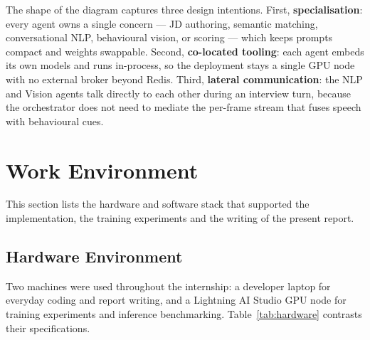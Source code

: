 The shape of the diagram captures three design intentions. First,
\textbf{specialisation}: every agent owns a single concern --- JD
authoring, semantic matching, conversational \acs{NLP}, behavioural
vision, or scoring --- which keeps prompts compact and weights
swappable. Second, \textbf{co-located tooling}: each agent embeds
its own models and runs in-process, so the deployment stays a
single \acs{GPU} node with no external broker beyond Redis. Third,
\textbf{lateral communication}: the NLP and Vision agents talk
directly to each other during an interview turn, because the
orchestrator does not need to mediate the per-frame stream that
fuses speech with behavioural cues.

\clearpage
\section{Work Environment}

This section lists the hardware and software stack that supported
the implementation, the training experiments and the writing of the
present report.

\subsection{Hardware Environment}

Two machines were used throughout the internship: a developer
laptop for everyday coding and report writing, and a Lightning AI
Studio \acs{GPU} node for training experiments and inference
benchmarking. Table~\ref{tab:hardware} contrasts their
specifications.

\begin{table}[H]
    \centering
    {\renewcommand{\arraystretch}{1.1}%
    }
    \caption{Hardware environment used during the internship.}
    \label{tab:hardware}
\end{table}

